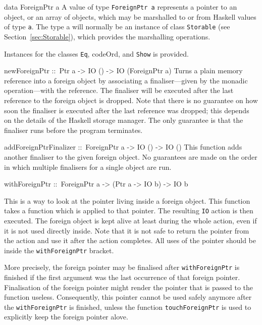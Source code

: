 \documentclass[a4paper,twosides]{article}
\makeatletter
\newcommand{\code}[1]{\texttt{#1}}      %
\newenvironment{codedesc}{%
  \list{}{\labelwidth\z@
    \let\makelabel\codedesclabel}
  }{%
  \endlist
  }
\newcommand*{\codedesclabel}[1]{%
  \hspace{-\leftmargin}
  \parbox[b]{\labelwidth}{\makebox[0pt][l]{\code{#1}}\\}\hfil\relax
  }
\makeatother
\begin{document}
\begin{codedesc}
\item[data ForeignPtr a] A value of type \code{ForeignPtr a} represents a
  pointer to an object, or an array of objects, which may be marshalled to or
  from Haskell values of type \code{a}.  The type a will normally be an
  instance of class \code{Storable} (see Section~\ref{sec:Storable}), which
  provides the marshalling operations.
  
  Instances for the classes \code{Eq}, code{Ord}, and \code{Show} is provided.
  
\item[newForeignPtr ::\ Ptr a -> IO () -> IO (ForeignPtr a)] Turns a plain
  memory reference into a foreign object by associating a finaliser---given by
  the monadic operation---with the reference. The finaliser will be executed
  after the last reference to the foreign object is dropped. Note that there
  is no guarantee on how soon the finaliser is executed after the last
  reference was dropped; this depends on the details of the Haskell storage
  manager. The only guarantee is that the finaliser runs before the program
  terminates.  
  
\item[addForeignPtrFinalizer ::\ ForeignPtr a -> IO () -> IO ()] This function
  adds another finaliser to the given foreign object. No guarantees are made
  on the order in which multiple finalisers for a single object are run.

\item[withForeignPtr ::\ ForeignPtr a -> (Ptr a -> IO b) -> IO b]
  
  This is a way to look at the pointer living inside a foreign object. This
  function takes a function which is applied to that pointer. The resulting
  \code{IO} action is then executed. The foreign object is kept alive at least
  during the whole action, even if it is not used directly inside. Note that
  it is not safe to return the pointer from the action and use it after the
  action completes.  All uses of the pointer should be inside the
  \code{withForeignPtr} bracket.

  More precisely, the foreign pointer may be finalised after
  \code{withForeignPtr} is finished if the first argument was the last
  occurrence of that foreign pointer.  Finalisation of the foreign pointer
  might render the pointer that is passed to the function useless.
  Consequently, this pointer cannot be used safely anymore after the
  \code{withForeignPtr} is finished, unless the function
  \code{touchForeignPtr} is used to explicitly keep the foreign pointer alove.
  

\end{codedesc}
\end{document}
